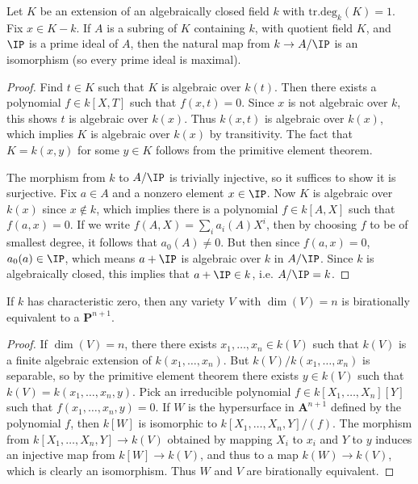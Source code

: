 \begin{lemma}
    Let $K$ be an extension of an algebraically closed field $k$ with $\text{tr.deg}_k(K) = 1$. Fix $x \in K - k$. If $A$ is a subring of $K$ containing $k$, with quotient field $K$, and $\IP$ is a prime ideal of $A$, then the natural map from $k \to A/\IP$ is an isomorphism (so every prime ideal is maximal).
\end{lemma}
\begin{proof}
    Find $t \in K$ such that $K$ is algebraic over $k(t)$. Then there exists a polynomial $f \in k[X,T]$ such that $f(x,t) = 0$. Since $x$ is not algebraic over $k$, this shows $t$ is algebraic over $k(x)$. Thus $k(x,t)$ is algebraic over $k(x)$, which implies $K$ is algebraic over $k(x)$ by transitivity. The fact that $K = k(x,y)$ for some $y \in K$ follows from the primitive element theorem.

    The morphism from $k$ to $A/\IP$ is trivially injective, so it suffices to show it is surjective. Fix $a \in A$ and a nonzero element $x \in \IP$. Now $K$ is algebraic over $k(x)$ since $x \not \in k$, which implies there is a polynomial $f \in k[A,X]$ such that $f(a,x) = 0$. If we write $f(A,X) = \sum_i a_i(A) X^i$, then by choosing $f$ to be of smallest degree, it follows that $a_0(A) \neq 0$. But then since $f(a,x) = 0$, $a_0(a) \in \IP$, which means $a + \IP$ is algebraic over $k$ in $A/\IP$. Since $k$ is algebraically closed, this implies that $a + \IP \in k$, i.e. $A/\IP = k$.
\end{proof}

\begin{theorem}
    If $k$ has characteristic zero, then any variety $V$ with $\dim(V) = n$ is birationally equivalent to a $\mathbf{P}^{n+1}$.
\end{theorem}
\begin{proof}
    If $\dim(V) = n$, there there exists $x_1,\dots,x_n \in k(V)$ such that $k(V)$ is a finite algebraic extension of $k(x_1,\dots,x_n)$. But $k(V) / k(x_1,\dots,x_n)$ is separable, so by the primitive element theorem there exists $y \in k(V)$ such that $k(V) = k(x_1,\dots,x_n,y)$. Pick an irreducible polynomial $f \in k[X_1,\dots,X_n][Y]$ such that $f(x_1,\dots,x_n,y) = 0$. If $W$ is the hypersurface in $\mathbf{A}^{n+1}$ defined by the polynomial $f$, then $k[W]$ is isomorphic to $k[X_1,\dots,X_n,Y]/(f)$. The morphism from $k[X_1,\dots,X_n,Y] \to k(V)$ obtained by mapping $X_i$ to $x_i$ and $Y$ to $y$ induces an injective map from $k[W] \to k(V)$, and thus to a map $k(W) \to k(V)$, which is clearly an isomorphism. Thus $W$ and $V$ are birationally equivalent.
\end{proof}

